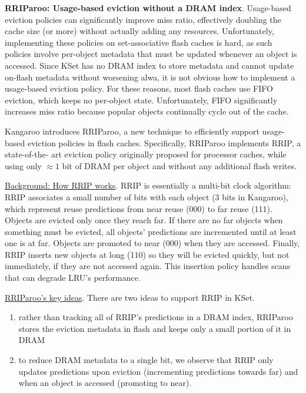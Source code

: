 \documentclass[11pt]{article}
\begin{document}
\textbf{RRIParoo: Usage-based eviction without a DRAM index}. Usage-based eviction policies can significantly
improve miss ratio, effectively doubling the cache size (or more) without actually adding any
resources. Unfortunately, implementing these policies on set-associative flash caches is hard, as such
policies involve per-object metadata that must be updated whenever an object is accessed. Since KSet
has no DRAM index to store metadata and cannot update on-flash metadata without worsening alwa, it is
not obvious how to implement a usage-based eviction policy. For these reasons, most flash caches use
FIFO eviction, which keeps no per-object state. Unfortunately, FIFO significantly increases miss ratio
because popular objects continually cycle out of the cache.

Kangaroo introduces RRIParoo, a new technique to efficiently support usage-based eviction policies in
flash caches. Specifically, RRIParoo implements RRIP, a state-of-the- art eviction policy originally
proposed for processor caches, while using only \(\approx 1\) bit of DRAM per object and without any
additional flash writes.

\uline{Background: How RRIP works}. RRIP is essentially a multi-bit clock algorithm: RRIP associates a small
number of bits with each object (3 bits in Kangaroo), which represent reuse predictions from near
reuse (000) to far reuse (111). Objects are evicted only once they reach far. If there are no far
objects when something must be evicted, all objects’ predictions are incremented until at least one is
at far. Objects are promoted to near (000) when they are accessed. Finally, RRIP inserts new objects
at long (110) so they will be evicted quickly, but not immediately, if they are not accessed again.
This insertion policy handles scans that can degrade LRU’s performance.

\uline{RRIParoo’s key ideas}. There are two ideas to support RRIP in KSet.
\begin{enumerate}
\item rather than tracking all of RRIP’s predictions in a DRAM index, RRIParoo stores the eviction
metadata in flash and keeps only a small portion of it in DRAM
\item to reduce DRAM metadata to a single bit, we observe that RRIP only updates predictions upon
eviction (incrementing predictions towards far) and when an object is accessed (promoting to near).
\end{enumerate}
\end{document}
